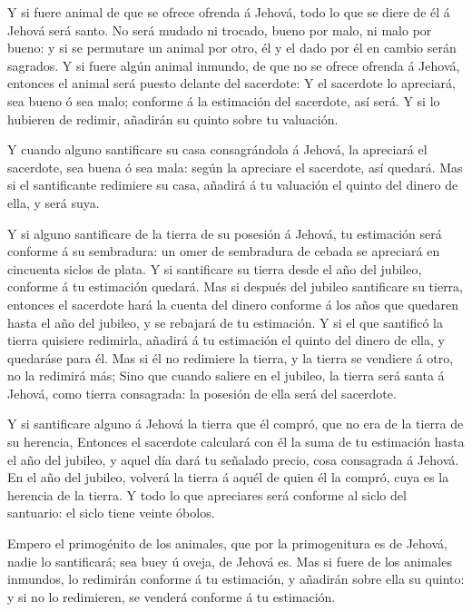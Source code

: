  Y si fuere animal de que se ofrece ofrenda á Jehová, todo
lo que se diere de él á Jehová será santo.  No será mudado
ni trocado, bueno por malo, ni malo por bueno: y si se permutare un
animal por otro, él y el dado por él en cambio serán sagrados.
 Y si fuere algún animal inmundo, de que no se ofrece
ofrenda á Jehová, entonces el animal será puesto delante del sacerdote:
 Y el sacerdote lo apreciará, sea bueno ó sea malo;
conforme á la estimación del sacerdote, así será.  Y si lo
hubieren de redimir, añadirán su quinto sobre tu valuación.

 Y cuando alguno santificare su casa consagrándola á
Jehová, la apreciará el sacerdote, sea buena ó sea mala: según la
apreciare el sacerdote, así quedará.  Mas si el
santificante redimiere su casa, añadirá á tu valuación el quinto del
dinero de ella, y será suya.

 Y si alguno santificare de la tierra de su posesión á
Jehová, tu estimación será conforme á su sembradura: un omer de
sembradura de cebada se apreciará en cincuenta siclos de plata.
 Y si santificare su tierra desde el año del jubileo,
conforme á tu estimación quedará.  Mas si después del
jubileo santificare su tierra, entonces el sacerdote hará la cuenta del
dinero conforme á los años que quedaren hasta el año del jubileo, y se
rebajará de tu estimación.  Y si el que santificó la tierra
quisiere redimirla, añadirá á tu estimación el quinto del dinero de
ella, y quedaráse para él.  Mas si él no redimiere la
tierra, y la tierra se vendiere á otro, no la redimirá más;
 Sino que cuando saliere en el jubileo, la tierra será
santa á Jehová, como tierra consagrada: la posesión de ella será del
sacerdote.

 Y si santificare alguno á Jehová la tierra que él compró,
que no era de la tierra de su herencia,  Entonces el
sacerdote calculará con él la suma de tu estimación hasta el año del
jubileo, y aquel día dará tu señalado precio, cosa consagrada á Jehová.
 En el año del jubileo, volverá la tierra á aquél de quien
él la compró, cuya es la herencia de la tierra.  Y todo lo
que apreciares será conforme al siclo del santuario: el siclo tiene
veinte óbolos.

 Empero el primogénito de los animales, que por la
primogenitura es de Jehová, nadie lo santificará; sea buey ú oveja, de
Jehová es.  Mas si fuere de los animales inmundos, lo
redimirán conforme á tu estimación, y añadirán sobre ella su quinto: y
si no lo redimieren, se venderá conforme á tu estimación.

